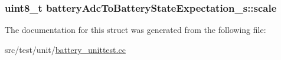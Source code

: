 \hypertarget{structbatteryAdcToBatteryStateExpectation__s_a49da24e721f379273137885ab365f5b2}{
\subsubsection[{scale}]{\setlength{\rightskip}{0pt plus 5cm}uint8\+\_\+t battery\+Adc\+To\+Battery\+State\+Expectation\+\_\+s\+::scale}}\label{structbatteryAdcToBatteryStateExpectation__s_a49da24e721f379273137885ab365f5b2}


The documentation for this struct was generated from the following file\+:\begin{DoxyCompactItemize}
\item 
src/test/unit/\hyperlink{battery__unittest_8cc}{battery\+\_\+unittest.\+cc}\end{DoxyCompactItemize}
